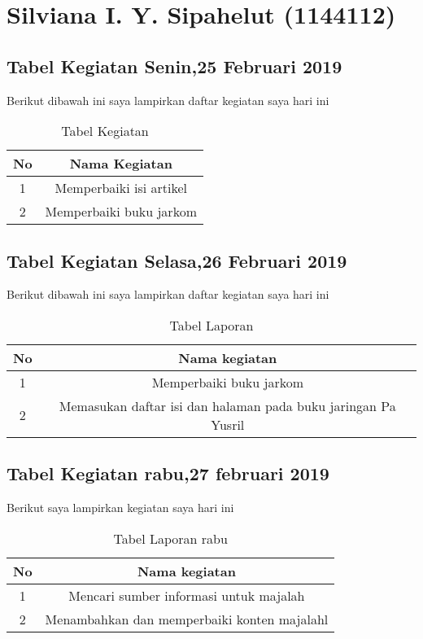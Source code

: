 \chapter{Silviana I. Y. Sipahelut (1144112)}
\section{Tabel Kegiatan Senin,25 Februari 2019}
Berikut dibawah ini saya lampirkan daftar kegiatan saya hari ini
\begin{table}[h]
\caption{Tabel Kegiatan}
\centering
\begin{tabular}{|c|c|}
\hline
No&Nama Kegiatan\\
\hline
1&Memperbaiki isi artikel\\
\hline
2&Memperbaiki buku jarkom\\
\hline
\end{tabular}
\label{table:Laporan kegiatan}
\end{table}

\section{Tabel Kegiatan Selasa,26 Februari 2019}
Berikut dibawah ini saya lampirkan daftar kegiatan saya hari ini
\begin{table}[h]
\caption{Tabel Laporan}
\centering
\begin{tabular}{|c|c|}
\hline
No&Nama kegiatan\\
\hline
1&Memperbaiki buku jarkom\\
\hline
2&Memasukan daftar isi dan halaman pada buku jaringan Pa Yusril\\
\hline
\end{tabular}
\label{table:Laporan kegiatan}
\end{table}

\section{Tabel Kegiatan rabu,27 februari 2019}
Berikut saya lampirkan kegiatan saya hari ini 
\begin{table}[h]
\caption{Tabel Laporan rabu}
\centering
\begin{tabular}{|c|c|}
\hline
No&Nama kegiatan\\
\hline
1&Mencari sumber informasi untuk majalah\\
\hline
2&Menambahkan dan memperbaiki konten majalahl\\
\hline
\end{tabular}
\label{table:Laporan kegiatan hari ini}
\end{table}

